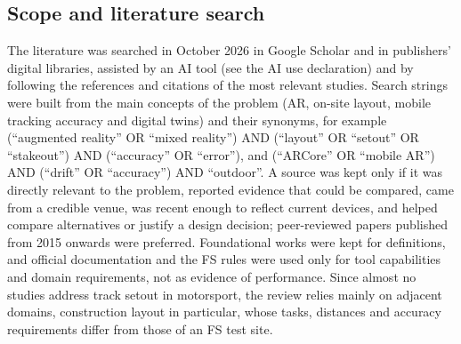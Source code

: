 \subsection{Scope and literature search}
The literature was searched in October 2026 in Google Scholar and in publishers' digital libraries, assisted by an AI tool (see the AI use declaration) and by following the references and citations of the most relevant studies. Search strings were built from the main concepts of the problem (AR, on-site layout, mobile tracking accuracy and digital twins) and their synonyms, for example (``augmented reality'' OR ``mixed reality'') AND (``layout'' OR ``setout'' OR ``stakeout'') AND (``accuracy'' OR ``error''), and (``ARCore'' OR ``mobile AR'') AND (``drift'' OR ``accuracy'') AND ``outdoor''. A source was kept only if it was directly relevant to the problem, reported evidence that could be compared, came from a credible venue, was recent enough to reflect current devices, and helped compare alternatives or justify a design decision; peer-reviewed papers published from 2015 onwards were preferred. Foundational works were kept for definitions, and official documentation and the FS rules were used only for tool capabilities and domain requirements, not as evidence of performance. Since almost no studies address track setout in motorsport, the review relies mainly on adjacent domains, construction layout in particular, whose tasks, distances and accuracy requirements differ from those of an FS test site.
